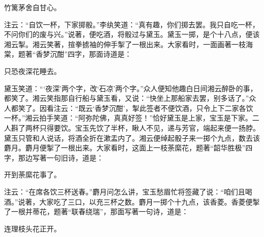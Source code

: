 \begin{poem}
    \begin{pl}
        竹篱茅舍自甘心。

    \end{pl}

\end{poem}


\begin{parag}
    注云：“自饮一杯，下家掷骰。”李纨笑道：“真有趣，你们掷去罢。我只自吃一杯，不问你们的废与兴。”说著，便吃酒，将骰过与黛玉。黛玉一掷，是个十八点，便该湘云掣。湘云笑著，揎拳掳袖的伸手掣了一根出来。大家看时，一面画著一枝海棠，题著“香梦沉酣”四字，那面诗道是：
\end{parag}


\begin{poem}
    \begin{pl}
        只恐夜深花睡去。
    \end{pl}
\end{poem}


\begin{parag}
    黛玉笑道：“‘夜深’两个字，改‘石凉’两个字。”众人便知他趣白日间湘云醉卧的事，都笑了。湘云笑指那自行船与黛玉看，又说：“快坐上那船家去罢，别多话了。”众人都笑了。因看注云：“既云‘香梦沉酣’，掣此签者不便饮酒，只令上下二家各饮一杯。”湘云拍手笑道：“阿弥陀佛，真真好签！”恰好黛玉是上家，宝玉是下家。二人斟了两杯只得要饮。宝玉先饮了半杯，瞅人不见，递与芳官，端起来便一扬脖。黛玉只管和人说话，将酒全折在漱盂内了。湘云便绰起骰子来一掷个九点，数去该麝月。麝月便掣了一根出来。大家看时，这面上一枝荼縻花，题著“韶华胜极”四字，那边写著一句旧诗，道是：
\end{parag}


\begin{poem}
    \begin{pl}

        开到荼縻花事了。
    \end{pl}
\end{poem}


\begin{parag}
    注云：“在席各饮三杯送春。”麝月问怎么讲，宝玉愁眉忙将签藏了说：“咱们且喝酒。”说著，大家吃了三口，以充三杯之数。麝月一掷个十九点，该香菱。香菱便掣了一根并蒂花，题著“联春绕瑞”，那面写著一句诗，道是：
\end{parag}


\begin{poem}
    \begin{pl}
        连理枝头花正开。
    \end{pl}
\end{poem}


